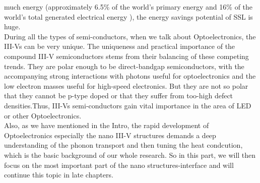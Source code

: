 much energy (approximately 6.5\% of
the world’s primary energy and 16\%
of the world’s total generated electrical
energy \cite{LEDworld}), the energy savings
potential of SSL is huge.\\
\indent During all the types of semi-conductors, when we talk about Optoelectronics, the III-Vs can be very unique.
The uniqueness and practical importance of the
compound III-V semiconductors stems from their
balancing of these competing trends. They are
polar enough to be direct-bandgap semiconductors,
with the accompanying strong interactions with
photons useful for optoelectronics and the low
electron masses useful for high-speed electronics.
But they are not so polar that they cannot be p-type
doped or that they suffer from too-high defect
densities.Thus, III-Vs semi-conductors gain vital importance in the area of LED or other Optoelectronics.\\
\indent Also, as we have mentioned in the Intro, the rapid development of Optoelectronics especially the nano III-V structures demands a deep understanding of the phonon transport and then tuning the heat condcution, which is the basic background of our whole research. So in this part, we will then focus on the most important part of the nano structures-interface and will continue this topic in late chapters.

